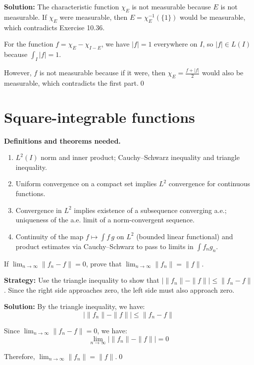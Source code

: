 \bigskip\noindent\textbf{Solution:}
The characteristic function $\chi_E$ is not measurable because $E$ is not measurable. If $\chi_E$ were measurable, then $E = \chi_E^{-1}(\{1\})$ would be measurable, which contradicts Exercise 10.36.

For the function $f = \chi_E - \chi_{I-E}$, we have $|f| = 1$ everywhere on $I$, so $|f| \in L(I)$ because $\int_I |f| = 1$.

However, $f$ is not measurable because if it were, then $\chi_E = \frac{f + |f|}{2}$ would also be measurable, which contradicts the first part.\qed
\section{Square-integrable functions}

\noindent\textbf{Definitions and theorems needed.}
\begin{enumerate}[label=(\alph*)]
\item $L^2(I)$ norm and inner product; Cauchy–Schwarz inequality and triangle inequality.
\item Uniform convergence on a compact set implies $L^2$ convergence for continuous functions.
\item Convergence in $L^2$ implies existence of a subsequence converging a.e.; uniqueness of the a.e. limit of a norm-convergent sequence.
\item Continuity of the map $f\mapsto \int f\,g$ on $L^2$ (bounded linear functional) and product estimates via Cauchy–Schwarz to pass to limits in $\int f_ng_n$.
\end{enumerate}



\begin{problembox}
If $\lim_{n \to \infty} \| f_n - f \| = 0$, prove that $\lim_{n \to \infty} \| f_n \| = \| f \|$.
\end{problembox}

\noindent\textbf{Strategy:} Use the triangle inequality to show that $|\| f_n \| - \| f \|| \leq \| f_n - f \|$. Since the right side approaches zero, the left side must also approach zero.

\bigskip\noindent\textbf{Solution:}
By the triangle inequality, we have:
\[|\| f_n \| - \| f \|| \leq \| f_n - f \|\]

Since $\lim_{n \to \infty} \| f_n - f \| = 0$, we have:
\[\lim_{n \to \infty} |\| f_n \| - \| f \|| = 0\]

Therefore, $\lim_{n \to \infty} \| f_n \| = \| f \|$.\qed


